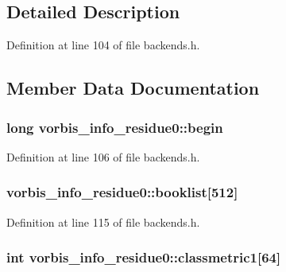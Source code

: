 \subsection{Detailed Description}


Definition at line 104 of file backends.\+h.



\subsection{Member Data Documentation}
\subsubsection[{\texorpdfstring{begin}{begin}}]{\setlength{\rightskip}{0pt plus 5cm}long vorbis\+\_\+info\+\_\+residue0\+::begin}\hypertarget{structvorbis__info__residue0_a655b0a80983f1646b7ad64fce2a14732}{}\label{structvorbis__info__residue0_a655b0a80983f1646b7ad64fce2a14732}


Definition at line 106 of file backends.\+h.

\subsubsection[{\texorpdfstring{booklist}{booklist}}]{ vorbis\+\_\+info\+\_\+residue0\+::booklist\mbox{[}512\mbox{]}}\hypertarget{structvorbis__info__residue0_a8ccd8efac3cb904de700849ca5c9b765}{}\label{structvorbis__info__residue0_a8ccd8efac3cb904de700849ca5c9b765}


Definition at line 115 of file backends.\+h.

\subsubsection[{\texorpdfstring{classmetric1}{classmetric1}}]{ {\bf int} vorbis\+\_\+info\+\_\+residue0\+::classmetric1\mbox{[}64\mbox{]}}\hypertarget{structvorbis__info__residue0_a3996afb2e64236286291ceb2fa072f79}{}\label{structvorbis__info__residue0_a3996afb2e64236286291ceb2fa072f79}


